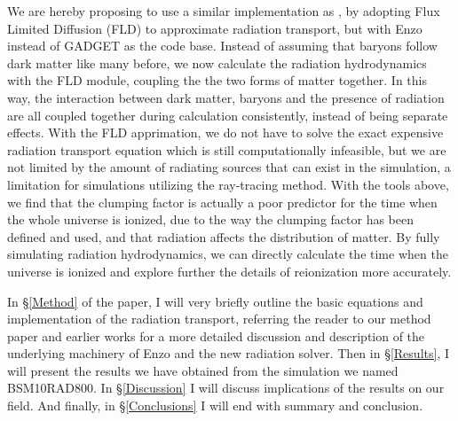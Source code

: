 We are hereby proposing to use a similar implementation as \citep{PetkovaSpringel2011}, by adopting Flux Limited Diffusion (FLD) to approximate radiation transport, but with Enzo instead of GADGET as the code base.  Instead of assuming that baryons follow dark matter like many before, we now calculate the radiation hydrodynamics with the FLD module, coupling the the two forms of matter together.  In this way, the interaction between dark matter, baryons and the presence of radiation are all coupled together during calculation consistently, instead of being separate effects.  With the FLD apprimation, we do not have to solve the exact expensive radiation transport equation which is still computationally infeasible, but we are not limited by the amount of radiating sources that can exist in the simulation, a limitation for simulations utilizing the ray-tracing method.  With the tools above, we find that the clumping factor is actually a poor predictor for the time when the whole universe is ionized, due to the way the clumping factor has been defined and used, and that radiation affects the distribution of matter.  By fully simulating radiation hydrodynamics, we can directly calculate the time when the universe is ionized and explore further the details of reionization more accurately.

In \S\ref{Method} of the paper, I will very briefly outline the basic equations and implementation of the radiation transport, referring the reader to our method paper and earlier works for a more detailed discussion and description of the underlying machinery of Enzo and the new radiation solver.  Then in \S\ref{Results}, I will present the results we have obtained from the simulation we named BSM10RAD800.  In \S\ref{Discussion} I will discuss implications of the results on our field.  And finally, in \S\ref{Conclusions} I will end with summary and conclusion.
